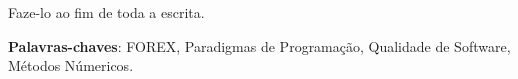 \begin{resumo}
 Faze-lo ao fim de toda a escrita.
 \vspace{\onelineskip}
    
 \noindent
 \textbf{Palavras-chaves}: FOREX, Paradigmas de Programação, Qualidade de Software, Métodos Númericos.
\end{resumo}
